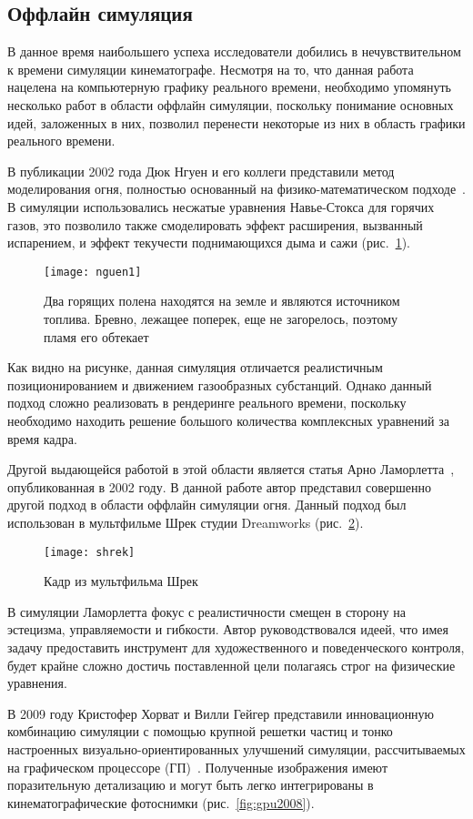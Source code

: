 \subsection{Оффлайн симуляция}
В данное время наибольшего успеха исследователи добились в нечувствительном к
времени симуляции кинематографе. Несмотря на то, что данная работа нацелена на
компьютерную графику реального времени, необходимо упомянуть несколько работ в
области оффлайн симуляции, поскольку понимание основных идей, заложенных в них,
позволил перенести некоторые из них в область графики реального времени.

В публикации 2002 года Дюк Нгуен и его коллеги представили метод моделирования огня,
полностью основанный на физико-математическом подходе~\cite{nguen2002}. В
симуляции использовались несжатые уравнения Навье-Стокса для горячих газов, это
позволило также смоделировать эффект расширения, вызванный испарением, и эффект
текучести поднимающихся дыма и сажи (рис.~\ref{fig:nguen}).
\begin{figure}[htb]
	\centering
	\texttt{[image: nguen1]}
    \caption{Два горящих полена находятся на земле и являются источником
    топлива. Бревно, лежащее поперек, еще не загорелось, поэтому пламя его
обтекает}%
    \label{fig:nguen}
\end{figure}
Как видно на рисунке, данная симуляция отличается реалистичным
позиционированием и движением газообразных субстанций. Однако данный подход
сложно реализовать в рендеринге реального времени, поскольку необходимо находить
решение большого количества комплексных уравнений за время кадра.

Другой выдающейся работой в этой области является статья Арно
Ламорлетта~\cite{Lamorlette}, опубликованная в 2002 году. В данной работе автор
представил совершенно другой подход в области оффлайн симуляции огня. Данный
подход был использован в мультфильме Шрек студии Dreamworks (рис.~\ref{fig:shrek}).
\begin{figure}[htb]
	\centering
	\texttt{[image: shrek]}
    \caption{Кадр из мультфильма Шрек}%
    \label{fig:shrek}
\end{figure}
В симуляции Ламорлетта фокус с реалистичности смещен в сторону на эстецизма,
управляемости и гибкости. Автор руководствовался идеей, что имея задачу
предоставить инструмент для художественного и поведенческого контроля, будет
крайне сложно достичь поставленной цели полагаясь строг на физические уравнения.

В 2009 году Кристофер Хорват и Вилли Гейгер представили инновационную комбинацию
симуляции с помощью крупной решетки частиц и тонко настроенных
визуально-ориентированных улучшений симуляции, рассчитываемых на графическом
процессоре (ГП)~\cite{Stock:2008:SWF:1400385.1400457}. Полученные изображения
имеют поразительную детализацию и могут быть легко интегрированы в
кинематографические фотоснимки (рис.~\ref{fig:gpu2008}).

